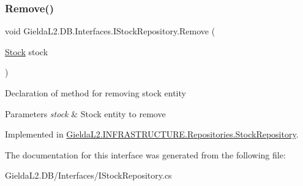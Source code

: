 \subsubsection{\texorpdfstring{Remove()}{Remove()}}
{\footnotesize\ttfamily void Gielda\+L2.\+D\+B.\+Interfaces.\+I\+Stock\+Repository.\+Remove (\begin{DoxyParamCaption}\item[{\mbox{\hyperlink{class_gielda_l2_1_1_d_b_1_1_entities_1_1_stock}{Stock}}}]{stock }\end{DoxyParamCaption})}



Declaration of method for removing stock entity 


\begin{DoxyParams}{Parameters}
{\em stock} & Stock entity to remove\\
\hline
\end{DoxyParams}


Implemented in \mbox{\hyperlink{class_gielda_l2_1_1_i_n_f_r_a_s_t_r_u_c_t_u_r_e_1_1_repositories_1_1_stock_repository_a939060d75ec4eda1c1d8a0f8824a088f}{Gielda\+L2.\+I\+N\+F\+R\+A\+S\+T\+R\+U\+C\+T\+U\+R\+E.\+Repositories.\+Stock\+Repository}}.



The documentation for this interface was generated from the following file\+:\begin{DoxyCompactItemize}
\item 
Gielda\+L2.\+D\+B/\+Interfaces/I\+Stock\+Repository.\+cs\end{DoxyCompactItemize}
